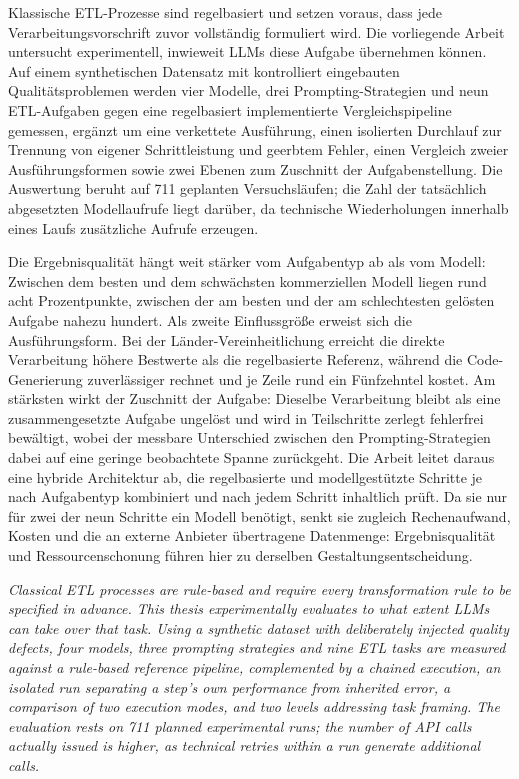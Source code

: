 

Klassische \ac{ETL}-Prozesse sind regelbasiert und setzen voraus, dass jede
Verarbeitungsvorschrift zuvor vollständig formuliert wird. Die vorliegende
Arbeit untersucht experimentell, inwieweit \acp{LLM} diese Aufgabe übernehmen
können. Auf einem synthetischen Datensatz mit kontrolliert eingebauten
Qualitätsproblemen werden vier Modelle, drei Prompting-Strategien und neun
\ac{ETL}-Aufgaben gegen eine regelbasiert implementierte Vergleichspipeline
gemessen, ergänzt um eine verkettete Ausführung, einen isolierten Durchlauf zur
Trennung von eigener Schrittleistung und geerbtem Fehler, einen Vergleich zweier
Ausführungsformen sowie zwei Ebenen zum Zuschnitt der Aufgabenstellung.
Die Auswertung beruht auf 711 geplanten Versuchsläufen; die Zahl der tatsächlich abgesetzten Modellaufrufe liegt darüber, da technische Wiederholungen innerhalb eines Laufs zusätzliche Aufrufe erzeugen.

Die Ergebnisqualität hängt weit stärker vom Aufgabentyp ab als vom Modell:
Zwischen dem besten und dem schwächsten kommerziellen Modell liegen rund acht
Prozentpunkte, zwischen der am besten und der am schlechtesten gelösten Aufgabe
nahezu hundert. Als zweite Einflussgröße erweist sich die Ausführungsform. Bei der Länder-Vereinheitlichung erreicht die direkte
Verarbeitung höhere Bestwerte als die regelbasierte Referenz, während die Code-Generierung zuverlässiger rechnet und je
Zeile rund ein Fünfzehntel kostet. Am stärksten wirkt der Zuschnitt der
Aufgabe: Dieselbe Verarbeitung bleibt als eine zusammengesetzte Aufgabe
ungelöst und wird in Teilschritte zerlegt fehlerfrei bewältigt, wobei der
messbare Unterschied zwischen den Prompting-Strategien dabei auf eine geringe beobachtete Spanne
zurückgeht. Die Arbeit leitet daraus eine hybride Architektur ab, die
regelbasierte und modellgestützte Schritte je nach Aufgabentyp kombiniert und
nach jedem Schritt inhaltlich prüft. Da sie nur für zwei der neun Schritte ein
Modell benötigt, senkt sie zugleich Rechenaufwand, Kosten und die an externe
Anbieter übertragene Datenmenge: Ergebnisqualität und Ressourcenschonung führen
hier zu derselben Gestaltungsentscheidung.

\vspace{0.8em}
\noindent
\textit{Classical \ac{ETL} processes are rule-based and require every transformation rule to be specified in advance. This thesis experimentally evaluates to what extent \acp{LLM} can take over that task. Using a synthetic dataset with deliberately injected quality defects, four models, three prompting strategies and nine \ac{ETL} tasks are measured against a rule-based reference pipeline, complemented by a chained execution, an isolated run separating a step's own performance from inherited error, a comparison of two execution modes, and two levels addressing task framing. The evaluation rests on 711 planned experimental runs; the number of API calls actually issued is higher, as technical retries within a run generate additional calls.}

